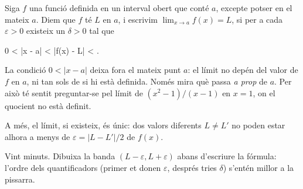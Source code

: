 %

\begin{frame}


\begin{definition}[Límit]
Siga $f$ una funció definida en un interval obert que conté $a$, excepte
potser en el mateix $a$. Diem que $f$ té  $L$ en $a$, i
escrivim $\lim_{x \to a} f(x) = L$, si per a cada $\varepsilon > 0$ existeix
un $\delta > 0$ tal que
\begin{keyformula}
  0 < |x - a| < \delta \implies |f(x) - L| < \varepsilon .
\end{keyformula}
\end{definition}

\begin{notesonly}
La condició $0 < |x - a|$ deixa fora el mateix punt $a$: el límit no depén
del valor de $f$ en $a$, ni tan sols de si hi està definida. Només mira què
passa \emph{a prop} de $a$. Per això té sentit preguntar-se pel límit de
$(x^2 - 1)/(x - 1)$ en $x = 1$, on el quocient no està definit.

A més, el límit, si existeix, és únic: dos valors diferents $L \neq L'$ no
poden estar alhora a menys de $\varepsilon = |L - L'|/2$ de $f(x)$.
\end{notesonly}

\begin{teaching}[Ritme]
Vint minuts. Dibuixa la banda $(L - \varepsilon, L + \varepsilon)$ abans
d'escriure la fórmula: l'ordre dels quantificadors (primer et donen
$\varepsilon$, després tries $\delta$) s'entén millor a la pissarra.
\end{teaching}
\end{frame}
